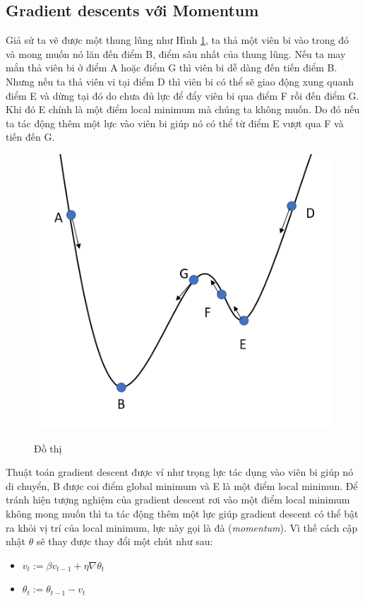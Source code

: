 \subsection{Gradient descents với Momentum}
Giả sử ta vẽ được một thung lũng như Hình \ref{fig:dothi}, ta thả một viên bi vào trong đó và mong muốn nó lăn đến điểm B, điểm sâu nhất của thung lũng. Nếu ta may mắn thả viên bi ở điểm A hoặc điểm G thì viên bi dễ dàng đến tiến điểm B. Nhưng nếu ta thả viên vi tại điểm D thì viên bi có thể sẽ giao động xung quanh điểm E và dừng tại đó do chưa đủ lực để đẩy viên bi qua điểm F rồi đến điểm G. Khi đó E chính là một điểm local minimum mà chúng ta không muốn. Do đó nếu ta tác động thêm một lực vào viên bi giúp nó có thể từ điểm E vượt qua F và tiến đến G. 
\begin{figure}[H]
\begin{center}
\label{fig:dothi}
\includegraphics[scale=1]{chap2/image/momentum.png}
\caption{Đồ thị }
\end{center}
\end{figure}
Thuật toán gradient descent được ví như trọng lực tác dụng vào viên bi giúp nó di chuyển, B được coi điểm global minimum và E là một điểm local minimun. Để tránh hiện tượng nghiệm của gradient descent rơi vào một điểm local minimum không mong muốn thì ta tác động thêm một lực giúp gradient descent có thể bật ra khỏi vị trí của local minimum, lực này gọi là đà (\textit{momentum}). Vì thế cách cập nhật $\theta$ sẽ thay được thay đổi một chút như sau:
\begin{itemize}
\item[] $v_t:= \beta v_{t-1} +\eta \nabla\theta_{t}$
\item[]  $ \theta_t:= \theta_{t-1} - v_t$
\end{itemize}
